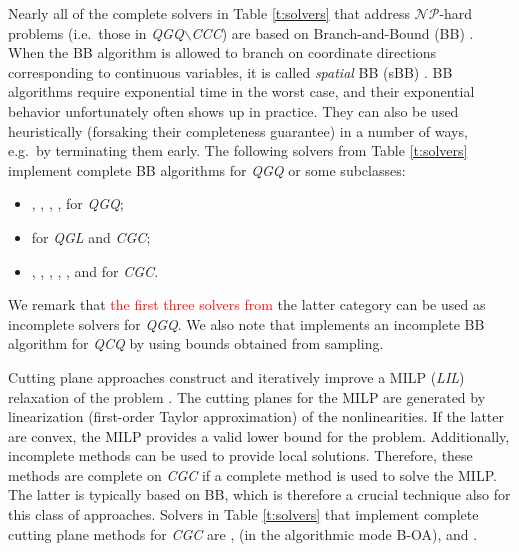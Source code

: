 Nearly all of the complete solvers in Table \ref{t:solvers} that address $\mathcal{NP}$-hard problems (i.e.~those in \textit{QGQ}$\smallsetminus$\textit{CCC}) are based on Branch-and-Bound (BB) \cite{land_doig}. When the BB algorithm is allowed to branch on coordinate directions corresponding to continuous variables, it is called \emph{spatial} BB (sBB) \cite{dakin,couenne}. BB algorithms require exponential time in the worst case, and their exponential behavior unfortunately often shows up in practice. They can also be used heuristically (forsaking their completeness guarantee) in a number of ways, e.g.~by terminating them early. The following solvers from Table \ref{t:solvers} implement complete BB algorithms for \textit{QGQ} or some subclasses: 
%
\begin{itemize}
 \item \antigone, \baron, \couenne, \lindo, \scip for \textit{QGQ};
\item \cplex for \textit{QGL} and \textit{CGC};
%
 \item \knitro, \bonmin, \sbb, \xpress, \gurobi, and \mosek for \textit{CGC}.
\end{itemize}
%
We remark that \textcolor{red}{the first three solvers from} the latter category can be used as incomplete solvers for \textit{QGQ}. We also note that \lgo implements an incomplete BB algorithm for \textit{QCQ} by using bounds obtained from sampling.

Cutting plane approaches construct and iteratively improve a MILP (\textit{LIL}) relaxation of the problem \cite{DuGr86,WePoe02}. The cutting planes for the MILP are generated by linearization (first-order Taylor approximation) of the nonlinearities. If the latter are convex, the MILP provides a valid lower bound for the problem. Additionally, incomplete methods can be used to provide local solutions. Therefore, these methods are complete on \textit{CGC} if a complete method is used to solve the MILP. The latter is typically based on BB, which is therefore a crucial technique also for this class of approaches. Solvers in Table \ref{t:solvers} that implement complete cutting plane methods for \textit{CGC} are \alphaecp, \bonmin (in the algorithmic mode B-OA), and \dicopt.

